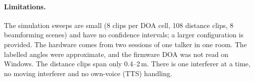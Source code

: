 \paragraph{Limitations.} The simulation sweeps are small (8 clips per DOA
cell, 108 distance clips, 8 beamforming scenes) and have no confidence
intervals; a larger configuration is provided. The hardware comes from two
sessions of one talker in one room. The labelled angles were approximate,
and the firmware DOA was not read on Windows. The distance clips span only
0.4--2\,m. There is one interferer at a time, no moving interferer and no
own-voice (TTS) handling.
